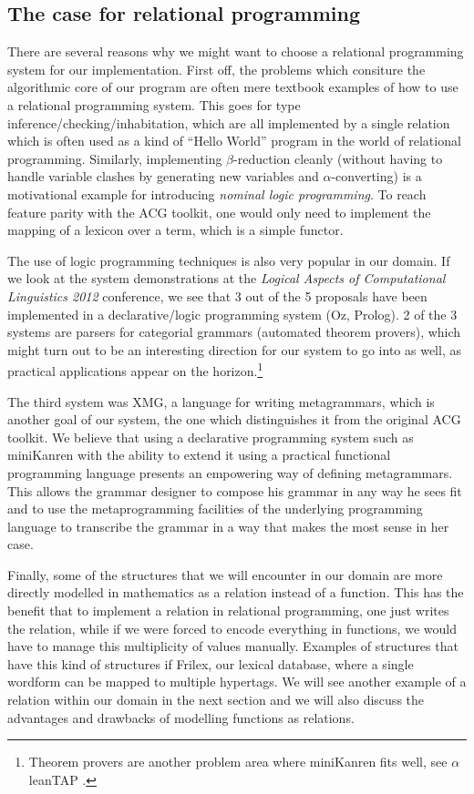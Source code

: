 \subsection{The case for relational programming}

There are several reasons why we might want to choose a relational
programming system for our implementation. First off, the problems which
consiture the algorithmic core of our program are often mere textbook
examples of how to use a relational programming system. This goes for
type inference/checking/inhabitation, which are all implemented by a
single relation which is often used as a kind of ``Hello World'' program
in the world of relational programming. Similarly, implementing
$\beta$-reduction cleanly (without having to handle variable clashes by
generating new variables and $\alpha$-converting) is a motivational
example for introducing \emph{nominal logic programming}. To reach
feature parity with the ACG toolkit, one would only need to implement
the mapping of a lexicon over a term, which is a simple functor.

The use of logic programming techniques is also very popular in our
domain. If we look at the system demonstrations at the \emph{Logical
  Aspects of Computational Linguistics 2012} conference, we see that 3
out of the 5 proposals have been implemented in a declarative/logic
programming system (Oz, Prolog). 2 of the 3 systems are parsers for
categorial grammars (automated theorem provers), which might turn out to
be an interesting direction for our system to go into as well, as
practical applications appear on the horizon.\footnote{Theorem provers
  are another problem area where miniKanren fits well, see
  $\alpha$leanTAP \cite{near2008alpha}.}

The third system was XMG, a language for writing metagrammars, which is
another goal of our system, the one which distinguishes it from the
original ACG toolkit. We believe that using a declarative programming
system such as miniKanren with the ability to extend it using a
practical functional programming language presents an empowering way of
defining metagrammars. This allows the grammar designer to compose his
grammar in any way he sees fit and to use the metaprogramming facilities
of the underlying programming language to transcribe the grammar in a
way that makes the most sense in her case.

Finally, some of the structures that we will encounter in our domain are
more directly modelled in mathematics as a relation instead of a
function. This has the benefit that to implement a relation in
relational programming, one just writes the relation, while if we were
forced to encode everything in functions, we would have to manage this
multiplicity of values manually. Examples of structures that have this
kind of structures if Frilex, our lexical database, where a single
wordform can be mapped to multiple hypertags. We will see another
example of a relation within our domain in the next section and we
will also discuss the advantages and drawbacks of modelling functions as
relations.

